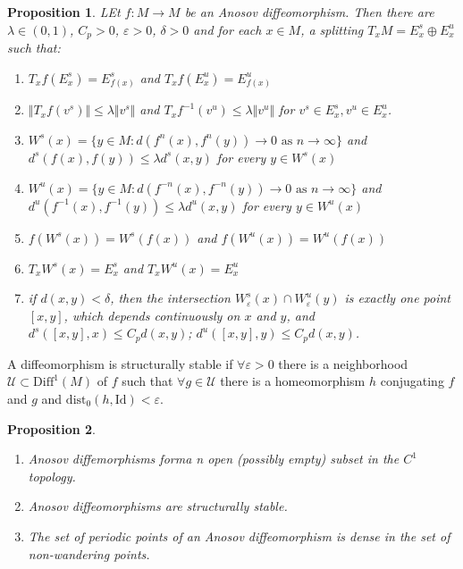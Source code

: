 \documentclass{article}
\newtheorem{prop}{Proposition}
\begin{document}
\begin{prop}

LEt $f:M \to M$ be an Anosov diffeomorphism. Then there are $\lambda \in (0,1)$, $C_p > 0$, $\varepsilon > 0$, $\delta > 0$ and for each $x \in M$, a splitting $T_xM = E^s_x \oplus E^u_x$ such that:

\begin{enumerate}
    \item $T_x f (E^s_x) = E^s_{f(x)}$ and $T_xf (E^u_x) = E^u_{f(x)}$
    \item $\Vert T_xf (v^s) \Vert \leq \lambda \Vert v^s \Vert $ and $T_xf^{-1}(v^u) \leq \lambda \Vert v^u \Vert$ for $v^s \in E^s_x, v^u \in E^u_x$.
    \item $W^s(x) = \{ y \in M: d(f^n(x), f^n(y)) \to 0 \text{ as } n \to \infty \}$ and $d^s(f(x),f(y)) \leq \lambda d^s(x,y)$ for every $y \in W^s(x)$
    \item $W^u(x) = \{ y \in M: d(f^{-n}(x), f^{-n}(y)) \to 0 \text{ as } n \to \infty \}$ and $d^u(f^{-1}(x), f^{-1}(y)) \leq \lambda d^u(x,y)$ for every $y \in W^u(x)$
    \item $f(W^s(x)) = W^s(f(x))$ and $f(W^u(x)) = W^u(f(x))$
    \item $T_xW^s(x) = E^s_x$ and $T_x W^u(x)=E^u_x$
    \item if $d(x,y) < \delta$, then the intersection $W^s_{\varepsilon}(x) \cap W^u_{\varepsilon}(y)$ is exactly one point $[x,y]$, which depends continuously on $x$ and $y$, and $d^s([x,y],x) \leq C_p d(x,y)$; $d^u([x,y],y) \leq C_p d(x,y)$.
\end{enumerate}
\end{prop}

\indent A diffeomorphism is structurally stable if $\forall \varepsilon > 0$ there is a neighborhood $\mathcal{U}\subset \mathrm{Diff}^1(M)$ of $f$ such that $\forall g \in \mathcal{U}$ there is a homeomorphism $h$ conjugating $f$ and $g$ and $\mathrm{dist}_0(h,\mathrm{Id}) < \varepsilon$.

\begin{prop}
\begin{enumerate}
    \item Anosov diffemorphisms forma n open (possibly empty) subset in the $C^1$ topology.
    \item Anosov diffeomorphisms are structurally stable.
    \item The set of periodic points of an Anosov diffeomorphism is dense in the set of non-wandering points.
\end{enumerate}
\end{prop}
\end{document}
